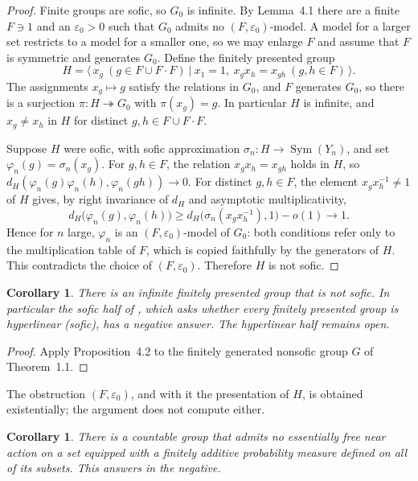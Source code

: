 \documentclass[10pt]{article}
\newtheorem{corollary}[theorem]{Corollary}
\newcommand{\Sym}{\operatorname{Sym}}
\begin{document}
\begin{proof}
Finite groups are sofic, so $G_0$ is infinite. By Lemma~4.1 there are a finite $F\ni1$ and an $\varepsilon_0>0$ such that $G_0$ admits no $(F,\varepsilon_0)$-model. A model for a larger set restricts to a model for a smaller one, so we may enlarge $F$ and assume that $F$ is symmetric and generates $G_0$. Define the finitely presented group
\[
H=\bigl\langle\,x_g\ (g\in F\cup F\!\cdot\!F)\ \big|\ x_1=1,\ x_gx_h=x_{gh}\ (g,h\in F)\,\bigr\rangle.
\]
The assignments $x_g\mapsto g$ satisfy the relations in $G_0$, and $F$ generates $G_0$, so there is a surjection $\pi:H\twoheadrightarrow G_0$ with $\pi(x_g)=g$. In particular $H$ is infinite, and $x_g\neq x_h$ in $H$ for distinct $g,h\in F\cup F\!\cdot\!F$.

Suppose $H$ were sofic, with sofic approximation $\sigma_n:H\to\Sym(Y_n)$, and set $\varphi_n(g)=\sigma_n(x_g)$. For $g,h\in F$, the relation $x_gx_h=x_{gh}$ holds in $H$, so $d_H(\varphi_n(g)\varphi_n(h),\varphi_n(gh))\to0$. For distinct $g,h\in F$, the element $x_gx_h^{-1}\neq1$ of $H$ gives, by right invariance of $d_H$ and asymptotic multiplicativity,
\[
d_H\bigl(\varphi_n(g),\varphi_n(h)\bigr)\geq d_H\bigl(\sigma_n(x_gx_h^{-1}),1\bigr)-o(1)\to1.
\]
Hence for $n$ large, $\varphi_n$ is an $(F,\varepsilon_0)$-model of $G_0$: both conditions refer only to the multiplication table of $F$, which is copied faithfully by the generators of $H$. This contradicts the choice of $(F,\varepsilon_0)$. Therefore $H$ is not sofic.
\end{proof}

\begin{corollary}
There is an infinite finitely presented group that is not sofic. In particular the sofic half of \cite[Open Question~4.11]{Pes08}, which asks whether every finitely presented group is hyperlinear (sofic), has a negative answer. The hyperlinear half remains open.
\end{corollary}

\begin{proof}
Apply Proposition~4.2 to the finitely generated nonsofic group $G$ of Theorem~1.1.
\end{proof}

The obstruction $(F,\varepsilon_0)$, and with it the presentation of $H$, is obtained existentially; the argument does not compute either.

\begin{corollary}
There is a countable group that admits no essentially free near action on a set equipped with a finitely additive probability measure defined on all of its subsets. This answers \cite[Open Question~5.3]{Pes08} in the negative.
\end{corollary}
\end{document}
